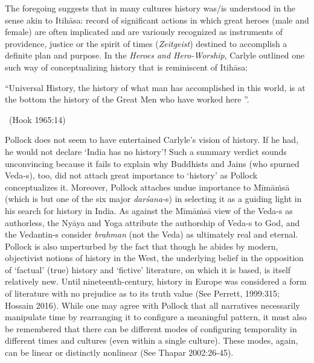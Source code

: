 The foregoing suggests that in many cultures history was/is understood in the sense akin to Itihāsa: record of significant actions in which great heroes (male and female) are often implicated and are variously recognized as instruments of providence, justice or the spirit of times (\textit{Zeitgeist}) destined to accomplish a definite plan and purpose. In the \textit{Heroes and Hero-Worship}, Carlyle outlined one such way of conceptualizing history that is reminiscent of Itihāsa:

\begin{myquote}
“Universal History, the history of what man has accomplished in this world, is at the bottom the history of the Great Men who have worked here ”.

~\hfill (Hook 1965:14)
\end{myquote}

Pollock does not seem to have entertained Carlyle’s vision of history. If he had, he would not declare ‘India has no history’! Such a summary verdict sounds unconvincing because it fails to explain why Buddhists and Jains (who spurned Veda-s), too, did not attach great importance to ‘history’ as Pollock conceptualizes it. Moreover, Pollock attaches undue importance to Mīmāṁsā (which is but one of the six major \textit{darśana-}s) in selecting it as a guiding light in his search for history in India. As against the Mīmāṁsā view of the Veda-s as authorless, the Nyāya and Yoga attribute the authorship of Veda-s to God, and the Vedantin-s consider \textit{brahman} (not the Veda) as ultimately real and eternal. Pollock is also unperturbed by the fact that though he abides by modern, objectivist notions of history in the West, the underlying belief in the opposition of ‘factual’ (true) history and ‘fictive’ literature, on which it is based, is itself relatively new. Until nineteenth-century, history in Europe was considered a form of literature with no prejudice as to its truth value (See Perrett, 1999:315; Hossain 2016). While one may agree with Pollock that all narratives necessarily manipulate time by rearranging it to configure a meaningful pattern, it must also be remembered that there can be different modes of configuring temporality in different times and cultures (even within a single culture). These modes, again, can be linear or distinctly nonlinear (See Thapar 2002:26-45).


